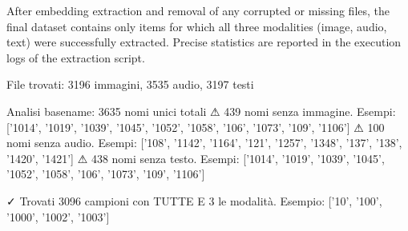 After embedding extraction and removal of any corrupted or missing files, the final dataset contains only items for which all three modalities (image, audio, text) were successfully extracted. Precise statistics are reported in the execution logs of the extraction script.




File trovati: 3196 immagini, 3535 audio, 3197 testi

Analisi basename: 3635 nomi unici totali
  ⚠ 439 nomi senza immagine. Esempi: ['1014', '1019', '1039', '1045', '1052', '1058', '106', '1073', '109', '1106']
  ⚠ 100 nomi senza audio. Esempi: ['108', '1142', '1164', '121', '1257', '1348', '137', '138', '1420', '1421']
  ⚠ 438 nomi senza testo. Esempi: ['1014', '1019', '1039', '1045', '1052', '1058', '106', '1073', '109', '1106']

✓ Trovati 3096 campioni con TUTTE E 3 le modalità. Esempio: ['10', '100', '1000', '1002', '1003']